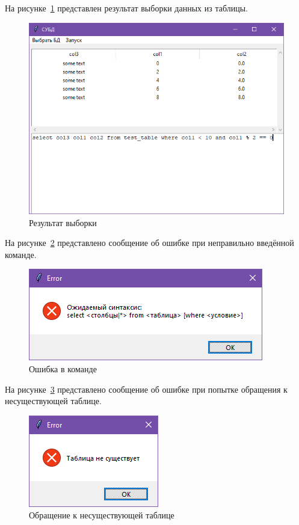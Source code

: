 На рисунке~\ref{fig:select_sql} представлен результат выборки данных из таблицы.
\begin{figure}[H]
	\centering
	\includegraphics[width=0.7\linewidth]{"images/выборка"}
	\caption{Результат выборки}
	\label{fig:select_sql}
\end{figure}

На рисунке~\ref{fig:error} представлено сообщение об ошибке при неправильно введённой команде.
\begin{figure}[H]
	\centering
	\includegraphics[width=0.7\linewidth]{"images/ошибка"}
	\caption{Ошибка в команде}
	\label{fig:error}
\end{figure}

На рисунке~\ref{fig:error_table} представлено сообщение об ошибке при попытке обращения к несуществующей таблице.
\begin{figure}[H]
	\centering
	\includegraphics[width=0.7\linewidth]{"images/ошибка таблица"}
	\caption{Обращение к несуществующей таблице}
	\label{fig:error_table}
\end{figure}

